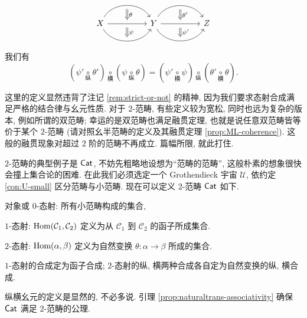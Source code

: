\begin{definition}
\begin{enumerate}[(i)]
\[\begin{tikzcd}
			X
			\arrow[bend left=60, rr, ""' name=U]
			\arrow[rr, "" name=MM, ""' name=M]
			\arrow[bend right=60, rr, "" name=D] & &
			\arrow[Rightarrow, to path=(U) -- (MM) \tikztonodes, "\theta"] \arrow[Rightarrow, to path=  (M) -- (D) \tikztonodes, "\psi"] Y
			\arrow[bend left=60, rr, ""' name=V]
			\arrow[rr, "" name=NN, ""' name=N]
			\arrow[bend right=60, rr, "" name=E] & &
			\arrow[Rightarrow, to path=(V) -- (NN) \tikztonodes, "\theta'"] \arrow[Rightarrow, to path=  (N) -- (E) \tikztonodes, "\psi'"] Z
		\end{tikzcd} \]
		我们有
		\[ \left( \psi' \underset{\text{纵}}{\circ} \theta'\right) \underset{\text{横}}{\circ} \left( \psi \underset{\text{纵}}{\circ} \theta\right) = \left( \psi' \underset{\text{横}}{\circ} \psi \right) \underset{\text{纵}}{\circ} \left( \theta' \underset{\text{横}}{\circ} \theta\right).  \]
	\end{enumerate}
\end{definition}

\begin{remark}
	这里的定义显然违背了注记 \ref{rem:strict-or-not} 的精神, 因为我们要求态射合成满足严格的结合律与幺元性质. 对于 $2$-范畴, 有些定义较为宽松, 同时也远为复杂的版本, 例如所谓的双范畴; 幸运的是双范畴也满足融贯定理, 也就是说任意双范畴皆等价于某个 $2$-范畴 (请对照幺半范畴的定义及其融贯定理 \ref{prop:ML-coherence}). 这般的融贯现象对超过 $2$ 阶的范畴不再成立. 篇幅所限, 就此打住.
\end{remark}

\begin{example}\label{eg:Cat}
	$2$-范畴的典型例子是 $\mathsf{Cat}$, 不妨先粗略地设想为``范畴的范畴'', 这般朴素的想象很快会撞上集合论的困难. 在此我们必须选定一个 Grothendieck 宇宙 $\mathcal{U}$, 依约定 \ref{con:U-small} 区分范畴与小范畴. 现在可以定义 $2$-范畴 $\mathsf{Cat}$ 如下.
	\begin{compactitem}
		\item 对象或 $0$-态射: 所有小范畴构成的集合,
		\item $1$-态射: $\operatorname{Hom}(\mathcal{C}_1, \mathcal{C}_2)$ 定义为从 $\mathcal{C}_1$ 到 $\mathcal{C}_2$ 的函子所成集合.
		\item $2$-态射: $\operatorname{Hom}(\alpha, \beta)$ 定义为自然变换 $\theta: \alpha \to \beta$ 所成的集合.
		\item $1$-态射的合成定为函子合成; $2$-态射的纵, 横两种合成各自定为自然变换的纵, 横合成.
	\end{compactitem}
	纵横幺元的定义是显然的, 不必多说. 引理 \ref{prop:naturaltrans-associativity} 确保 $\mathsf{Cat}$ 满足 $2$-范畴的公理.
\end{example}

